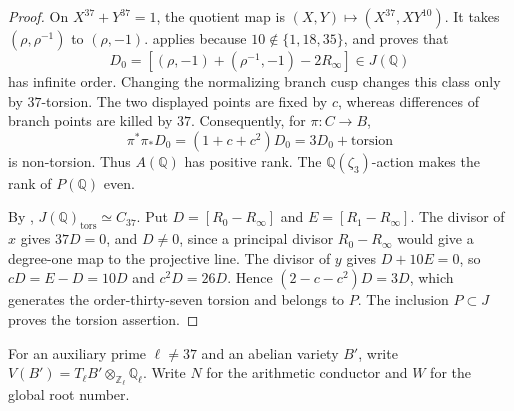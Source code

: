 \begin{proof}
On $X^{37}+Y^{37}=1$, the quotient map is
$(X,Y)\mapsto(X^{37},XY^{10})$.  It takes
$(\rho,\rho^{-1})$ to $(\rho,-1)$.
\citet[Theorem~2.1, pp.~208--209]{GrossRohrlich1978} applies because
$10\notin\{1,18,35\}$, and proves that
\[
 D_0=[(\rho,-1)+(\rho^{-1},-1)-2R_\infty]\in J(\mathbb Q)
\]
has infinite order.  Changing the normalizing branch cusp changes
this class only by $37$-torsion.  The two displayed points are fixed
by $c$, whereas differences of branch points are killed by $37$.
Consequently, for $\pi:C\to B$,
\[
 \pi^*\pi_*D_0=(1+c+c^2)D_0=3D_0+\text{torsion}
\]
is non-torsion.  Thus $A(\mathbb Q)$ has positive rank.
The $\mathbb Q(\zeta_3)$-action makes the rank of $P(\mathbb Q)$ even.

By \citet[Theorem~1.1, p.~202]{GrossRohrlich1978},
$J(\mathbb Q)_{\mathrm{tors}}\simeq C_{37}$.
Put $D=[R_0-R_\infty]$ and $E=[R_1-R_\infty]$.
The divisor of $x$ gives $37D=0$, and $D\ne0$, since a principal
divisor $R_0-R_\infty$ would give a degree-one map to the projective
line.  The divisor of $y$ gives $D+10E=0$, so
$cD=E-D=10D$ and $c^2D=26D$.
Hence $(2-c-c^2)D=3D$, which generates the order-thirty-seven
torsion and belongs to $P$.  The inclusion $P\subset J$ proves
the torsion assertion.
\end{proof}

For an auxiliary prime $\ell\ne37$ and an abelian variety $B'$,
write $V(B')=T_\ell B'\otimes_{\mathbb Z_\ell}\mathbb Q_\ell$.
Write $N$ for the arithmetic conductor and $W$ for the global root number.

